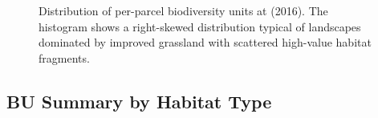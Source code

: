 \begin{figure}[H]
\centering
{}
\caption{Distribution of per-parcel biodiversity units at \Tzero{} (2016). The histogram shows a right-skewed distribution typical of landscapes dominated by improved grassland with scattered high-value habitat fragments.}
\label{fig:bu-histogram-2016}
\end{figure}

\subsection{BU Summary by Habitat Type}

